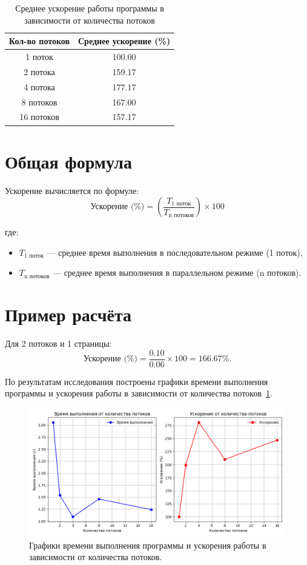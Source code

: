 \begin{table}[h!]
\centering
\caption{Среднее ускорение работы программы в зависимости от количества потоков}
\label{tbl:average_speedup}
\begin{tabular}{|c|c|}
\hline
Кол-во потоков & Среднее ускорение (\%) \\ 
\hline
1 поток        & 100.00 \\ 
2 потока       & 159.17 \\ 
4 потока       & 177.17 \\ 
8 потоков      & 167.00 \\ 
16 потоков     & 157.17 \\ 
\hline
\end{tabular}
\end{table}


\section*{Общая формула}
Ускорение вычисляется по формуле:
\begin{equation}
\text{Ускорение (\%)} = \left( \frac{T_{\text{1 поток}}}{T_{\text{n потоков}}} \right) \times 100
\end{equation}

где:
\begin{itemize}
    \item \(T_{\text{1 поток}}\) — среднее время выполнения в последовательном режиме (1 поток),
    \item \(T_{\text{n потоков}}\) — среднее время выполнения в параллельном режиме (n потоков).
\end{itemize}

\section*{Пример расчёта}
Для 2 потоков и 1 страницы:
\begin{equation}
\text{Ускорение (\%)} = \frac{0.10}{0.06} \times 100 = 166.67\%.
\end{equation}


По результатам исследования построены графики времени выполнения программы и ускорения работы в зависимости от количества потоков~\ref{images:Graphics}.
\begin{figure}[H]
    \centering
    \includegraphics[width=170mm]{images/Graphics}
    \caption{Графики времени выполнения программы и ускорения работы в зависимости от количества потоков.}
    \label{images:Graphics}
\end{figure}

